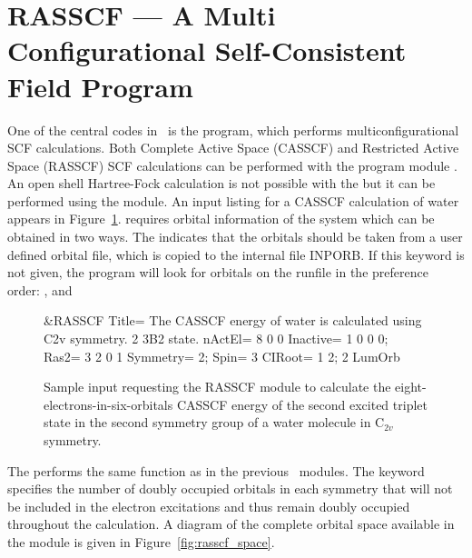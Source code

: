 \section[RASSCF --- A Multi Configurational SCF Program]
        {RASSCF --- A Multi Configurational 
                                Self-Consistent Field Program}
\label{TUT:sec:rasscf}
One of the central codes in \molcas\ is the  program, which
performs multiconfigurational SCF calculations. Both Complete Active Space 
(CASSCF) and Restricted Active Space (RASSCF) SCF calculations can be performed 
with the  program module \cite{Roos:92}.  
An open shell Hartree-Fock calculation is not possible with the 
but it can be performed using the  module. An input listing for 
a CASSCF calculation of water appears in Figure~\ref{fig:rasscf_input}.
 requires orbital information of the system which can be 
obtained in two ways. The  indicates that the orbitals should be
taken from a user defined orbital file, which is copied to the internal file
INPORB. If this keyword is not given, the program will look for orbitals on the
runfile in the preference order: ,  and

\begin{figure}[htbp]
\caption{Sample input requesting the RASSCF module to calculate the 
eight-electrons-in-six-orbitals CASSCF energy of the second excited triplet 
state in the second symmetry group of a water molecule in C$_{2v}$ symmetry.}
\label{fig:rasscf_input}
\begin{inputlisting}
 &RASSCF 
Title= The CASSCF energy of water is calculated using C2v symmetry. 2 3B2 state.
nActEl= 8 0 0
Inactive= 1 0 0 0; Ras2= 3 2 0 1
Symmetry= 2; Spin= 3
CIRoot= 1 2; 2
LumOrb
\end{inputlisting}
\end{figure}

The  performs the same function as in the previous \molcas\
modules. The keyword  specifies the number of doubly occupied
orbitals in each symmetry that will not be included in the electron excitations 
and thus remain doubly occupied throughout the calculation. A diagram of the 
complete orbital space available in the \program{RASSCF} module is given in 
Figure~\ref{fig:rasscf_space}.

